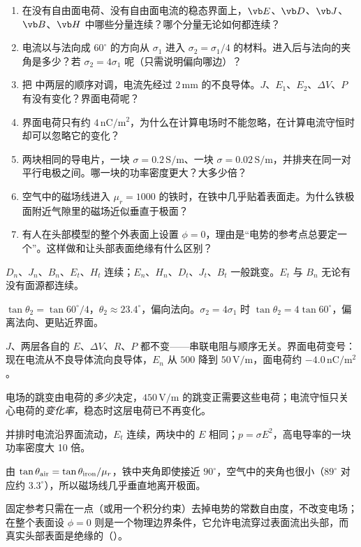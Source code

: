 \begin{selfcheck}
\begin{enumerate}
\item 在没有自由面电荷、没有自由面电流的稳态界面上，$\vb E$、$\vb D$、$\vb J$、$\vb B$、$\vb H$ 中哪些分量连续？哪个分量无论如何都连续？
\item 电流以与法向成 $60^\circ$ 的方向从 $\sigma_1$ 进入 $\sigma_2=\sigma_1/4$ 的材料。进入后与法向的夹角是多少？若 $\sigma_2=4\sigma_1$ 呢（只需说明偏向哪边）？
\item 把 中两层的顺序对调，电流先经过 $2\,\mathrm{mm}$ 的不良导体。$J$、$E_1$、$E_2$、$\Delta V$、$P$ 有没有变化？界面电荷呢？
\item 界面电荷只有约 $4\,\mathrm{nC/m^2}$，为什么在计算电场时不能忽略，在计算电流守恒时却可以忽略它的变化？
\item 两块相同的导电片，一块 $\sigma=0.2\,\mathrm{S/m}$、一块 $\sigma=0.02\,\mathrm{S/m}$，并排夹在同一对平行电极之间。哪一块的功率密度更大？大多少倍？
\item 空气中的磁场线进入 $\mu_r=1000$ 的铁时，在铁中几乎贴着表面走。为什么铁极面附近气隙里的磁场近似垂直于极面？
\item 有人在头部模型的整个外表面上设置 $\phi=0$，理由是“电势的参考点总要定一个”。这样做和让头部表面绝缘有什么区别？
\end{enumerate}
\end{selfcheck}

\begin{answers}
\item $D_n$、$J_n$、$B_n$、$E_t$、$H_t$ 连续；$E_n$、$H_n$、$D_t$、$J_t$、$B_t$ 一般跳变。$E_t$ 与 $B_n$ 无论有没有面源都连续。
\item $\tan\theta_2=\tan60^\circ/4$，$\theta_2\approx23.4^\circ$，偏向法向。$\sigma_2=4\sigma_1$ 时 $\tan\theta_2=4\tan60^\circ$，偏离法向、更贴近界面。
\item $J$、两层各自的 $E$、$\Delta V$、$R$、$P$ 都不变——串联电阻与顺序无关。界面电荷变号：现在电流从不良导体流向良导体，$E_n$ 从 $500$ 降到 $50\,\mathrm{V/m}$，面电荷约 $-4.0\,\mathrm{nC/m^2}$。
\item 电场的跳变由电荷的\emph{多少}决定，$450\,\mathrm{V/m}$ 的跳变正需要这些电荷；电流守恒只关心电荷的\emph{变化率}，稳态时这层电荷已不再变化。
\item 并排时电流沿界面流动，$E_t$ 连续，两块中的 $E$ 相同；$p=\sigma E^2$，高电导率的一块功率密度大 10 倍。
\item 由 $\tan\theta_{\rm air}=\tan\theta_{\rm iron}/\mu_r$，铁中夹角即使接近 $90^\circ$，空气中的夹角也很小（$89^\circ$ 对应约 $3.3^\circ$），所以磁场线几乎垂直地离开极面。
\item 固定参考只需在一点（或用一个积分约束）去掉电势的常数自由度，不改变电场；在整个表面设 $\phi=0$ 则是一个物理边界条件，它允许电流穿过表面流出头部，而真实头部表面是绝缘的（）。
\end{answers}
